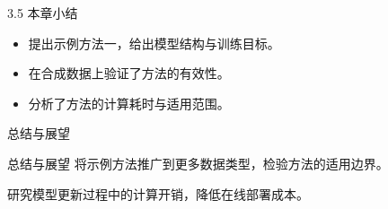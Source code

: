 \documentclass[aspectratio=169,11pt]{ctexbeamer}
\begin{document}
\begin{frame}{3.5 本章小结}
\begin{itemize}
  \item 提出示例方法一，给出模型结构与训练目标。
  \item 在合成数据上验证了方法的有效性。
  \item 分析了方法的计算耗时与适用范围。
\end{itemize}
\end{frame}

\begin{frame}{总结与展望}
\begingroup\noindent
\begin{minipage}[t]{0.315\linewidth}
\end{minipage}\hfill
\begin{minipage}[t]{0.315\linewidth}
\end{minipage}\hfill
\begin{minipage}[t]{0.315\linewidth}
\end{minipage}\par\endgroup
\end{frame}

\begin{frame}{总结与展望}
\quad 将示例方法推广到更多数据类型，检验方法的适用边界。

\vspace{0.3cm}
\quad 研究模型更新过程中的计算开销，降低在线部署成本。
\end{frame}

\begin{frame}[plain]
\DefenseThanksFrame
\end{frame}
\end{document}
